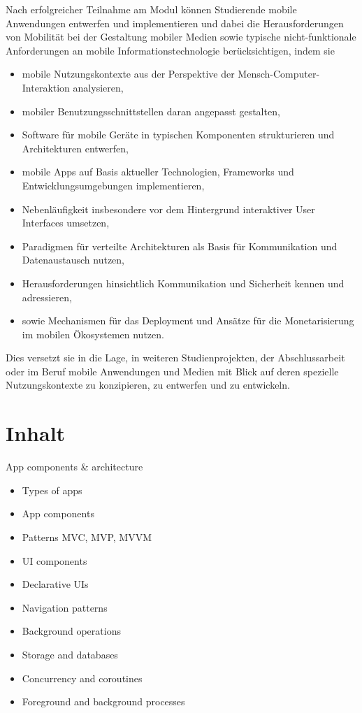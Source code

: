 Nach erfolgreicher Teilnahme am Modul können Studierende mobile
Anwendungen entwerfen und implementieren und dabei die Herausforderungen
von Mobilität bei der Gestaltung mobiler Medien sowie typische
nicht-funktionale Anforderungen an mobile Informationstechnologie
berücksichtigen, indem sie

\begin{itemize}
\tightlist
\item
  mobile Nutzungskontexte aus der Perspektive der
  Mensch-Computer-Interaktion analysieren,
\item
  mobiler Benutzungsschnittstellen daran angepasst gestalten,
\item
  Software für mobile Geräte in typischen Komponenten strukturieren und
  Architekturen entwerfen,
\item
  mobile Apps auf Basis aktueller Technologien, Frameworks und
  Entwicklungsumgebungen implementieren,
\item
  Nebenläufigkeit insbesondere vor dem Hintergrund interaktiver User
  Interfaces umsetzen,
\item
  Paradigmen für verteilte Architekturen als Basis für Kommunikation und
  Datenaustausch nutzen,
\item
  Herausforderungen hinsichtlich Kommunikation und Sicherheit kennen und
  adressieren,
\item
  sowie Mechanismen für das Deployment und Ansätze für die
  Monetarisierung im mobilen Ökosystemen nutzen.
\end{itemize}

Dies versetzt sie in die Lage, in weiteren Studienprojekten, der
Abschlussarbeit oder im Beruf mobile Anwendungen und Medien mit Blick
auf deren spezielle Nutzungskontexte zu konzipieren, zu entwerfen und zu
entwickeln.

\hypertarget{inhaltpathlabel....srcmodulbeschreibungen-bachelor-bpo5ba_mobile-computing}{%
\section*{Inhalt\label{../../src/modulbeschreibungen-bachelor-bpo5/BA_Mobile-Computing}}\label{inhaltpathlabel....srcmodulbeschreibungen-bachelor-bpo5ba_mobile-computing}}

App components \& architecture

\begin{itemize}
\tightlist
\item
  Types of apps
\item
  App components
\item
  Patterns MVC, MVP, MVVM
\item
  UI components
\item
  Declarative UIs
\item
  Navigation patterns
\item
  Background operations
\item
  Storage and databases
\item
  Concurrency and coroutines
\item
  Foreground and background processes
\end{itemize}

